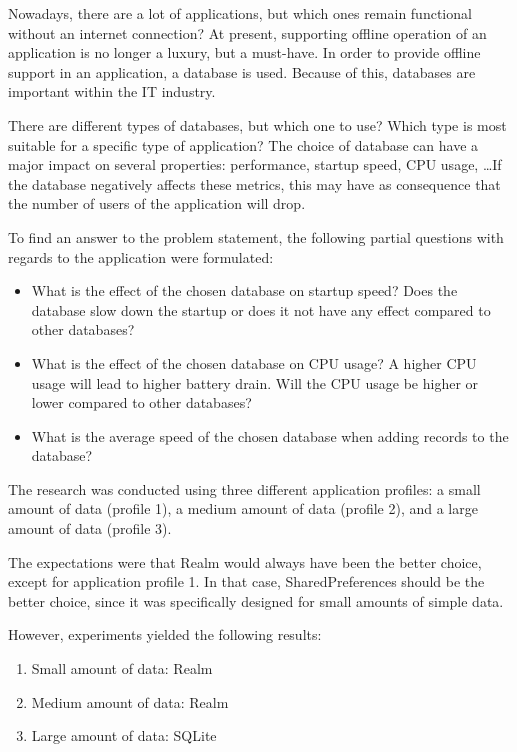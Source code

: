 \begin{displayquote}
  Nowadays, there are a lot of applications, but which ones remain functional without an internet connection? At present, supporting offline operation of an application is no longer a luxury, but a must-have. In order to provide offline support in an application, a database is used. Because of this, databases are important within the IT industry.
  
  There are different types of databases, but which one to use? Which type is most suitable for a specific type of application? The choice of database can have a major impact on several properties: performance, startup speed, CPU usage, \ldots If the database negatively affects these metrics, this may have as consequence that the number of users of the application will drop.
  
  To find an answer to the problem statement, the following partial questions with regards to the application were formulated:
  
  \begin{itemize}
    \item What is the effect of the chosen database on startup speed? Does the database slow down the startup or does it not have any effect compared to other databases?
    \item What is the effect of the chosen database on CPU usage? A higher CPU usage will lead to higher battery drain. Will the CPU usage be higher or lower compared to other databases?
    \item What is the average speed of the chosen database when adding records to the database?
  \end{itemize}
  
  The research was conducted using three different application profiles: a small amount of data (profile 1), a medium amount of data (profile 2), and a large amount of data (profile 3).
  
  The expectations were that Realm would always have been the better choice, except for application profile 1. In that case, SharedPreferences should be the better choice, since it was specifically designed for small amounts of simple data.
  
  However, experiments yielded the following results:
  
  \begin{enumerate}
    \item Small amount of data: Realm
    \item Medium amount of data: Realm
    \item Large amount of data: SQLite
  \end{enumerate}

\end{displayquote}

